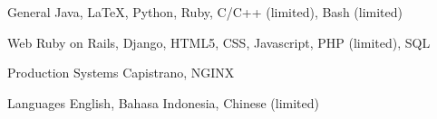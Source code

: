 


\begin{cvskills}


	\cvskill
	{General}
	{Java, LaTeX, Python, Ruby, C/C++ (limited), Bash (limited)}


	\cvskill
	{Web}
	{Ruby on Rails, Django, HTML5, CSS, Javascript, PHP (limited), SQL}


	\cvskill
	{Production Systems}
	{Capistrano, NGINX}


	\cvskill
	{Languages}
	{English, Bahasa Indonesia, Chinese (limited)}


\end{cvskills}
